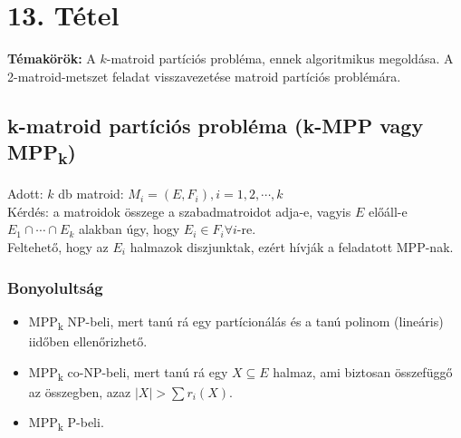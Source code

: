
\setcounter{chapter}{13}
\chapter*{13. Tétel}

\textbf{Témakörök:} A $k$-matroid partíciós probléma, ennek algoritmikus megoldása. A 2-matroid-metszet feladat visszavezetése matroid partíciós problémára.

\noindent\hrulefill

\section*{k-matroid partíciós probléma (k-MPP vagy {MPP\textsubscript{k}})}
Adott: $k$ db matroid: $M_{i}=(E,F_{i}), i=1,2,\cdots ,k$\\
Kérdés: a matroidok összege a szabadmatroidot adja-e, vagyis $E$ előáll-e $E_{1}\cap\cdots\cap E_{k}$ alakban úgy, hogy $E_{i}\in F_{i} \forall i$-re.\\
Feltehető, hogy az $E_{i}$ halmazok diszjunktak, ezért hívják a feladatott MPP-nak.

\subsection*{Bonyolultság}
\begin{itemize}
\item {MPP\textsubscript{k}} NP-beli, mert tanú rá egy partícionálás és a tanú polinom (lineáris) iidőben ellenőrizhető.
\item {MPP\textsubscript{k}} co-NP-beli, mert tanú rá egy $X\subseteq E$ halmaz, ami biztosan összefüggő az összegben, azaz $|X|>\sum r_{i}(X)$.
\item {MPP\textsubscript{k}} P-beli.
\end{itemize}

